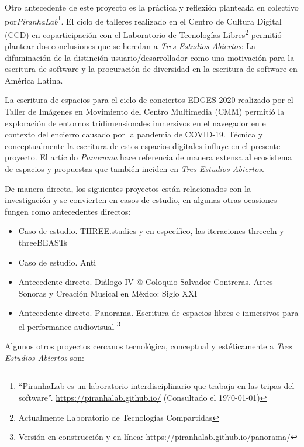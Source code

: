 Otro antecedente de este proyecto es la práctica y reflexión planteada en colectivo por\textit{PiranhaLab}\footnote{``PiranhaLab es un laboratorio interdisciplinario que trabaja en las tripas del software''. \url{https://piranhalab.github.io/} (Consultado el \today)}. El ciclo de talleres realizado en el Centro de Cultura Digital (CCD) en coparticipación con el Laboratorio de Tecnologías Libres\footnote{Actualmente Laboratorio de Tecnologías Compartidas} permitió plantear dos conclusiones que se heredan a \textit{Tres Estudios Abiertos}: La difuminación de la distinción usuario/desarrollador como una motivación para la escritura de software y la procuración de diversidad en la escritura de software en América Latina.

La escritura de espacios para el ciclo de conciertos EDGES 2020 realizado por el Taller de Imágenes en Movimiento del Centro Multimedia (CMM) permitió la exploración de entornos tridimensionales inmersivos en el navegador en el contexto del encierro causado por la pandemia de COVID-19. Técnica y conceptualmente la escritura de estos espacios digitales influye en el presente proyecto. El artículo \textit{Panorama} \citep{panoramaArticulo} hace referencia de manera extensa al ecosistema de espacios y propuestas que también inciden en \textit{Tres Estudios Abiertos}.

De manera directa, los siguientes proyectos están relacionados con la investigación y se convierten en casos de estudio, en algunas otras ocasiones fungen como antecedentes directos:

\begin{itemize}

\item Caso de estudio. THREE.studies \citep{threestudies} y en específico, las iteraciones threecln \citep{threecln} y threeBEASTs \citep{threeBEASTs}
\item Caso de estudio. Anti \citep{anti} 
\item Antecedente directo. Diálogo IV @ Coloquio Salvador Contreras. Artes Sonoras y Creación Musical en México: Siglo XXI \citep{dialogo}
\item Antecedente directo. Panorama. Escritura de espacios libres e inmersivos para el performance audiovisual \citep{panoramaArticulo}\footnote{Versión en construcción y en línea: \url{https://piranhalab.github.io/panorama/}}
  
\end{itemize}

Algunos otros proyectos cercanos tecnológica, conceptual y estéticamente a \textit{Tres Estudios Abiertos} son: 

